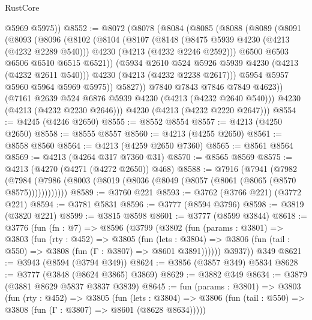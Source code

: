 \begin{lexlean}{RustCore}
\begin{coremodule}
        @5969
        @5975))
@8552 := @8072
    (@8078
      (@8084
        (@8085
          (@8088
            (@8089
              (@8091
                (@8093
                  (@8096
                    (@8102
                      (@8104
                        (@8107
                          (@8148
                            (@8475 @5939 @4230 (@4213 (@4232 @2289 @540)))
                            @4230
                            (@4213 (@4232 @2246 @2592)))
                          @6500
                          @6503
                          @6506
                          @6510
                          @6515
                          @6521))
                      (@5934 @2610 @524 @5926 @5939 @4230 (@4213 (@4232 @2611 @540)))
                      @4230
                      (@4213 (@4232 @2238 @2617)))
                    @5954
                    @5957
                    @5960
                    @5964
                    @5969
                    @5975))
                @5827))
            @7840
            @7843
            @7846
            @7849
            @4623))
        (@7161 @2639 @524 @6876 @5939 @4230 (@4213 (@4232 @2640 @540)))
        @4230
        (@4213 (@4232 @2230 @2646)))
      @4230
      (@4213 (@4232 @2220 @2647)))
@8554 := @4245 (@4246 @2650)
@8555 := @8552 @8554
@8557 := @4213 (@4250 @2650)
@8558 := @8555 @8557
@8560 := @4213 (@4255 @2650)
@8561 := @8558 @8560
@8564 := @4213 (@4259 @2650 @7360)
@8565 := @8561 @8564
@8569 := @4213 (@4264 @317 @7360 @31)
@8570 := @8565 @8569
@8575 := @4213 (@4270 (@4271 (@4272 @2650)) @468)
@8588 := @7916
    (@7941
      (@7982 (@7984 (@7986 (@8003 (@8019 (@8036 (@8049 (@8057 (@8061 (@8065 (@8570 @8575))))))))))))
@8589 := @3760 @221
@8593 := @3762 (@3766 @221) (@3772 @221)
@8594 := @3781 @5831
@8596 := @3777 (@8594 @3796)
@8598 := @3819 (@3820 @221)
@8599 := @3815 @8598
@8601 := @3777 (@8599 @3844)
@8618 := @3776
    (fun (fn : @7) =>
    @8596
      (@3799
        (@3802
          (fun (params : @3801) =>
          @3803
            (fun (rty : @452) =>
            @3805
              (fun (lets : @3804) =>
              @3806 (fun (tail : @550) => @3808 (fun (Γ : @3807) => @8601 @3891))))))
        @3937))
    @349
@8621 := @3943 (@8594 (@3794 @349))
@8624 := @3856 (@3857 @349) @5834
@8628 := @3777 (@3848 (@8624 @3865) @3869)
@8629 := @3882 @349
@8634 := @3879 (@3881 @8629 @5837 @3837 @3839)
@8645 := fun (params : @3801) =>
  @3803
    (fun (rty : @452) =>
    @3805
      (fun (lets : @3804) =>
      @3806 (fun (tail : @550) => @3808 (fun (Γ : @3807) => @8601 (@8628 @8634)))))

\end{coremodule}
\end{lexlean}
